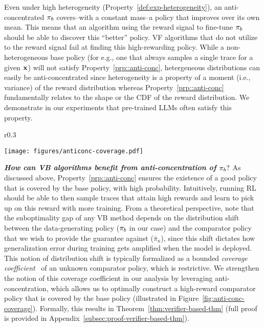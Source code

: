 Even under high heterogeneity (Property~\ref{def:exp-heterogeneity}), an anti-concentrated $\pi_b$ covers--with a constant mass--a policy that improves over its own mean. This means that an algorithm using the reward signal to fine-tune $\pi_b$ should be able to discover this ``better'' policy. VF algorithms that do not utilize to the reward signal fail at finding this high-rewarding policy.
While a non-heterogeneous base policy (for e.g., one that always samples a single trace for a given $\mathbf{x}$) will not satisfy Property~\ref{prp::anti-conc}, hetergeneous distributions can easily be anti-concentrated since heterogeneity is a property of a moment (i.e., variance) of the reward distribution whereas Property~\ref{prp::anti-conc} fundamentally relates to the shape or the CDF of the reward distribution. 
We demonstrate in our experiments that pre-trained LLMs often satisfy this property.

\begin{wrapfigure}{r}{0.3\textwidth}
\vspace{-0.6cm}
  \begin{center}
    \texttt{[image: figures/anticonc-coverage.pdf]}
  \end{center}
  \vspace{-0.5cm}
  \caption{\footnotesize \textbf{\emph{Anti-concentration:}} Heterogeneous distributions admit coverage over high reward policies (dashed orange line) when anti-concentrated.\vspace{-0.3cm}}
    \label{fig:anti-conc-coverage}
\end{wrapfigure}
\textbf{\emph{How can VB algorithms benefit from anti-concentration of $\pi_b?$}} As discussed above, Property~\ref{prp::anti-conc} ensures the existence of a good policy that is covered by the base policy, with high probability. Intuitively, running RL should be able to then sample traces that attain high rewards and learn to pick up on this reward with more training.
From a theoretical perspective, note that the suboptimality gap of any VB method depends on the distribution shift between the data-generating policy ($\pi_b$ in our case) and the comparator policy that we wish to provide the guarantee against ($\bar{\pi}_\kappa$), since this shift dictates how generalization error during training gets amplified when the model is deployed.
This notion of distribution shift is typically formalized as a bounded \emph{coverage coefficient}~\citep{rashidinejad2021bridging} of an unknown comparator policy, which is restrictive. We strengthen the notion of this coverage coefficient in our analysis by leveraging anti-concentration, which allows us to optimally construct a high-reward comparator policy that is covered by the base policy (illustrated in Figure~\ref{fig:anti-conc-coverage}).  Formally, this results in Theorem~\ref{thm:verifier-based-thm} (full proof is provided in Appendix~\ref{subsec:proof-verifier-based-thm}).

